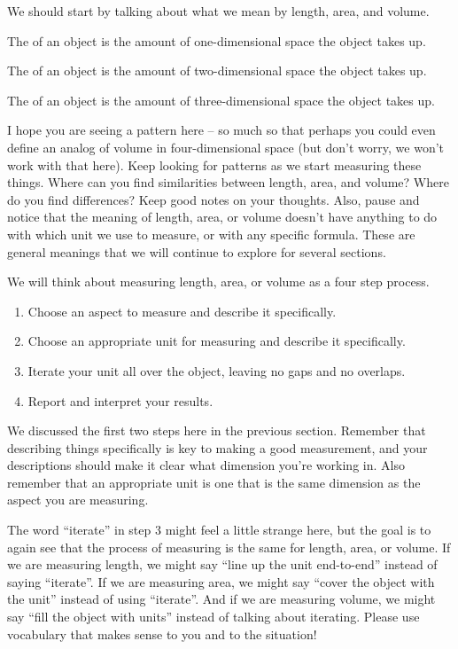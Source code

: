 \documentclass{ximera}
\begin{document}
We should start by talking about what we mean by length, area, and volume.
\begin{definition}
The  of an object is the amount of one-dimensional space the object takes up.
\end{definition}
\begin{definition}
The  of an object is the amount of two-dimensional space the object takes up.
\end{definition}
\begin{definition}
The  of an object is the amount of three-dimensional space the object takes up.
\end{definition}
I hope you are seeing a pattern here -- so much so that perhaps you could even define an analog of volume in four-dimensional space (but don't worry, we won't work with that here). Keep looking for patterns as we start measuring these things. Where can you find similarities between length, area, and volume? Where do you find differences? Keep good notes on your thoughts. Also, pause and notice that the meaning of length, area, or volume doesn't have anything to do with which unit we use to measure, or with any specific formula. These are general meanings that we will continue to explore for several sections.






We will think about measuring length, area, or volume as a four step process.
\begin{enumerate}[label=\arabic{enumi}.]
	\item Choose an aspect to measure and describe it specifically.
	\item Choose an appropriate unit for measuring and describe it specifically.
	\item Iterate your unit all over the object, leaving no gaps and no overlaps.
	\item Report and interpret your results.
\end{enumerate}

We discussed the first two steps here in the previous section. Remember that describing things specifically is key to making a good measurement, and your descriptions should make it clear what dimension you're working in. Also remember that an appropriate unit is one that is the same dimension as the aspect you are measuring.

The word ``iterate'' in step 3 might feel a little strange here, but the goal is to again see that the process of measuring is the same for length, area, or volume. If we are measuring length, we might say ``line up the unit end-to-end'' instead of saying ``iterate''. If we are measuring area, we might say ``cover the object with the unit'' instead of using ``iterate''. And if we are measuring volume, we might say ``fill the object with units'' instead of talking about iterating. Please use vocabulary that makes sense to you and to the situation!
\end{document}

